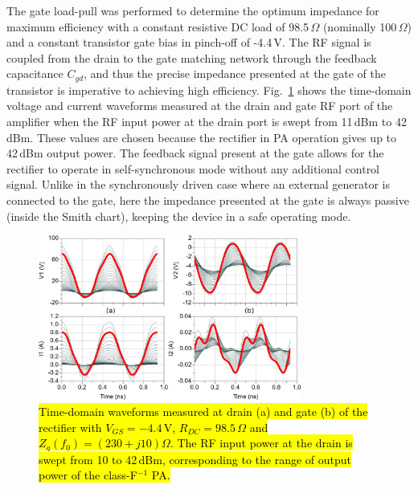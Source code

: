 The gate load-pull was performed to determine the optimum impedance for maximum efficiency with a constant resistive DC load of 98.5\,$\Omega$ (nominally 100\,$\Omega$) and a constant transistor gate bias in pinch-off of -4.4\,V. The RF signal is coupled from the drain to the gate matching network through the feedback capacitance $C_{gd}$, and thus the precise impedance presented at the gate of the transistor is imperative to achieving high efficiency. Fig.~\ref{time-domain} shows the time-domain voltage and current waveforms measured at the drain and gate RF port of the amplifier when the RF input power at the drain port is swept from 11\,dBm to 42\,dBm. These values are chosen because the rectifier in PA operation gives up to 42\,dBm output power. The feedback signal present at the gate allows for the rectifier to operate in self-synchronous mode without any additional control signal. Unlike in the synchronously driven case where an external generator is connected to the gate, here the impedance presented at the gate is always passive (inside the Smith chart), keeping the device in a safe operating mode.

\begin{figure}[ht!]
\centering
\includegraphics[width=3.4in]{pdf/11.png}
\caption{\hl{Time-domain waveforms measured at drain (a) and gate (b) of the rectifier with $V_{GS}=-4.4$\,V, $R_{DC}=98.5$\,$\Omega$ and $Z_g(f_0)=\left(230+j10\right)\Omega$. The RF input power at the drain is swept from 10 to 42\,dBm, corresponding to the range of output power of the class-F$^{-1}$ PA.}}
\label{time-domain}
\end{figure}

